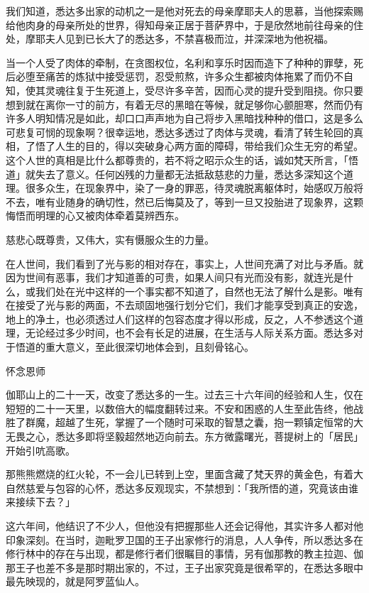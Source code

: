 \documentclass[12pt,twoside,openany]{book}
\begin{document}
我们知道，悉达多出家的动机之一是他对死去的母亲摩耶夫人的思慕，当他探索赐给他肉身的母亲所处的世界，得知母亲正居于菩萨界中，于是欣然地前往母亲的住处，摩耶夫人见到已长大了的悉达多，不禁喜极而泣，并深深地为他祝福。

当一个人受了肉体的牵制，在贪图权位，名利和享乐时因而造下了种种的罪孽，死后必堕至痛苦的炼狱中接受惩罚，忍受煎熬，许多众生都被肉体拖累了而仍不自知，使其灵魂往复于生死道上，受尽许多辛苦，因而心灵的提升受到阻挠。你只要想到就在离你一寸的前方，有着无尽的黑暗在等候，就足够你心颤胆寒，然而仍有许多人明知情况是如此，却口口声声地为自己将步入黑暗找种种的借口，这是多么可悲复可悯的现象啊？很幸运地，悉达多透过了肉体与灵魂，看清了转生轮回的真相，了悟了人生的目的，得以突破身心两方面的障碍，带给我们众生无穷的希望。这个人世的真相是比什么都尊贵的，若不将之昭示众生的话，诚如梵天所言，「悟道」就失去了意义。任何凶残的力量都无法抵敌慈悲的力量，悉达多深知这个道理。很多众生，在现象界中，染了一身的罪恶，待灵魂脱离躯体时，始感叹万般将不去，唯有业随身的确切性，然已后悔莫及了，等到一旦又投胎进了现象界，这颗悔悟而明理的心又被肉体牵着莫辨西东。

慈悲心既尊贵，又伟大，实有慑服众生的力量。

在人世间，我们看到了光与影的相对存在，事实上，人世间充满了对比与矛盾。就因为世间有恶事，我们才知道善的可贵，如果人间只有光而没有影，就连光是什么，或我们处在光中这样的一个事实都不知道了，自然也无法了解什么是影。唯有在接受了光与影的两面，不去顽固地强行划分它们，我们才能享受到真正的安逸，地上的净土，也必须透过人们这样的包容态度才得以形成，反之，人不参透这个道理，无论经过多少时间，也不会有长足的进展，在生活与人际关系方面。悉达多对于悟道的重大意义，至此很深切地体会到，且刻骨铭心。

怀念恩师

伽耶山上的二十一天，改变了悉达多的一生。过去三十六年间的经验和人生，仅在短短的二十一天里，以数倍大的幅度翻转过来。不安和困惑的人生至此告终，他战胜了群魔，超越了生死，掌握了一个随时可采取的智慧之囊，抱一颗镇定恒常的大无畏之心，悉达多即将坚毅超然地迈向前去。东方微露曙光，菩提树上的「居民」开始引吭高歌。

那熊熊燃烧的红火轮，不一会儿已转到上空，里面含藏了梵天界的黄金色，有着大自然慈爱与包容的心怀，悉达多反观现实，不禁想到：「我所悟的道，究竟该由谁来接续下去？」

这六年间，他结识了不少人，但他没有把握那些人还会记得他，其实许多人都对他印象深刻。在当时，迦毗罗卫国的王子出家修行的消息，人人争传，所以悉达多在修行林中的存在与出现，都是修行者们很瞩目的事情，另有伽那教的教主拉迦、伽那王子也差不多是那时期出家的，不过，王子出家究竟是很希罕的，在悉达多眼中最先映现的，就是阿罗蓝仙人。
\end{document}
